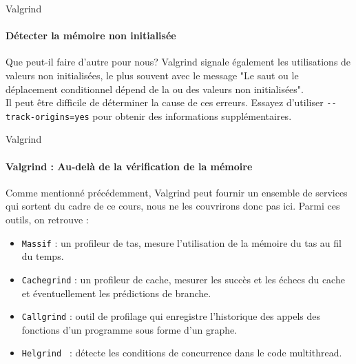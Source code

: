 \begin{frame}{Valgrind}
	\framesubtitle{Détecter la mémoire non initialisée}
	\begin{block}{Que peut-il faire d'autre pour nous?}
		Valgrind signale également les utilisations de valeurs \alert{non initialisées}, le plus souvent avec le message "Le saut ou le déplacement conditionnel dépend de la ou des valeurs non initialisées". \\
		Il peut être difficile de déterminer la cause de ces erreurs. Essayez d'utiliser \alert{\texttt{-{}-track-origins=yes}} pour obtenir des informations supplémentaires.
	\end{block}
\end{frame}

\begin{frame}{Valgrind}
	\framesubtitle{Valgrind : Au-delà de la vérification de la mémoire}
	Comme mentionné précédemment, Valgrind peut fournir un ensemble de services qui sortent du cadre de ce cours, nous ne les couvrirons donc pas ici. Parmi ces outils, on retrouve :
	\begin{itemize}
		\item \alert{\texttt{Massif}} : un profileur de tas, mesure l'utilisation de la mémoire du tas au fil du temps.
		\item \alert{\texttt{Cachegrind}} : un profileur de cache, mesurer les succès et les échecs du cache et éventuellement les prédictions de branche.
		\item \alert{\texttt{Callgrind}} : outil de profilage qui enregistre l'historique des appels des fonctions d'un programme sous forme d'un graphe.
		\item \alert{\texttt{Helgrind }} : détecte les conditions de concurrence dans le code multithread.
	\end{itemize}
\end{frame}
